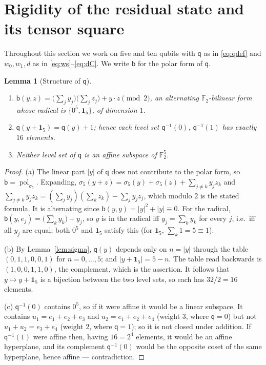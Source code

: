 \documentclass[11pt]{article}
\theoremstyle{plain}
\newtheorem{lemma}[theorem]{Lemma}
\theoremstyle{definition}
\newcommand{\F}{\mathbb{F}}
\newcommand{\qq}{\mathsf{q}}
\newcommand{\bb}{\mathsf{b}}
\newcommand{\one}{\mathbf{1}}
\newcommand{\wt}[1]{\lvert #1\rvert}
\DeclareMathOperator{\pol}{pol}
\begin{document}
\section{Rigidity of the residual state and its tensor square}\label{sec:rigid}

Throughout this section we work on five and ten qubits with $\qq$ as in
\eqref{eq:qdef} and $w_0,w_1,d$ as in \eqref{eq:ws}--\eqref{eq:dC}. We write
$\bb$ for the polar form of $\qq$.

\begin{lemma}[Structure of $\qq$]\label{lem:qstruct}
\begin{enumerate}[label=(\alph*)]
\item $\bb(y,z)=\big(\sum_jy_j\big)\big(\sum_jz_j\big)+y\cdot z \pmod 2$, an
alternating $\F_2$-bilinear form whose radical is $\{0^5,\one_5\}$, of dimension $1$.
\item $\qq(y+\one_5)=\qq(y)+1$; hence each level set $\qq^{-1}(0)$, $\qq^{-1}(1)$ has
exactly $16$ elements.
\item Neither level set of $\qq$ is an affine subspace of $\F_2^5$.
\end{enumerate}
\end{lemma}

\begin{proof}
(a) The linear part $\wt y$ of $\qq$ does not contribute to the polar form, so
$\bb=\pol_{\sigma_5}$. Expanding,
$\sigma_5(y+z)=\sigma_5(y)+\sigma_5(z)+\sum_{j\ne k}y_jz_k$ and
$\sum_{j\ne k}y_jz_k=(\sum_jy_j)(\sum_kz_k)-\sum_jy_jz_j$, which modulo $2$ is the
stated formula. It is alternating since $\bb(y,y)=\wt y^2+\wt y\equiv0$. For the
radical, $\bb(y,e_j)=\big(\sum_ky_k\big)+y_j$, so $y$ is in the radical iff
$y_j=\sum_ky_k$ for every $j$, i.e.\ iff all $y_j$ are equal; both $0^5$ and $\one_5$
satisfy this (for $\one_5$, $\sum_k1=5\equiv1$).

(b) By Lemma~\ref{lem:sigma}, $\qq(y)$ depends only on $n=\wt y$ through the table
$(0,1,1,0,0,1)$ for $n=0,\dots,5$; and $\wt{y+\one_5}=5-n$. The table read backwards is
$(1,0,0,1,1,0)$, the complement, which is the assertion. It follows that
$y\mapsto y+\one_5$ is a bijection between the two level sets, so each has $32/2=16$
elements.

(c) $\qq^{-1}(0)$ contains $0^5$, so if it were affine it would be a linear subspace.
It contains $u_1=e_1+e_2+e_3$ and $u_2=e_1+e_2+e_4$ (weight $3$, where $\qq=0$) but not
$u_1+u_2=e_3+e_4$ (weight $2$, where $\qq=1$); so it is not closed under addition. If
$\qq^{-1}(1)$ were affine then, having $16=2^4$ elements, it would be an affine
hyperplane, and its complement $\qq^{-1}(0)$ would be the opposite coset of the same
hyperplane, hence affine --- contradiction.
\end{proof}
\end{document}
